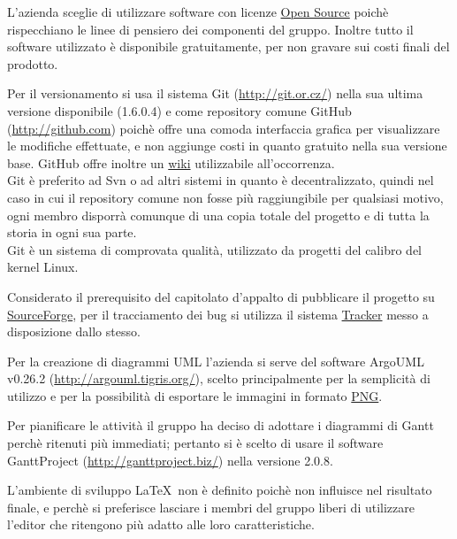 L'azienda sceglie di utilizzare software con licenze \underline{Open Source} poich\`e rispecchiano le linee di pensiero dei componenti del gruppo. Inoltre tutto il software utilizzato \`e disponibile gratuitamente, per non gravare sui costi finali del prodotto.

Per il versionamento si usa il sistema Git (\href{http://git.or.cz/}{http://git.or.cz/}) nella sua ultima versione disponibile (1.6.0.4) e come repository comune GitHub (\href{http://github.com}{http://github.com}) poich\`e offre una comoda interfaccia grafica per visualizzare le modifiche effettuate, e non aggiunge costi in quanto gratuito nella sua versione base. GitHub offre inoltre un \underline{wiki} utilizzabile all'occorrenza.\\
Git \`e preferito ad Svn o ad altri sistemi in quanto \`e decentralizzato, quindi nel caso in cui il repository comune non fosse pi\`u raggiungibile per qualsiasi motivo, ogni membro disporr\`a comunque di una copia totale del progetto e di tutta la storia in ogni sua parte.\\
Git \`e un sistema di comprovata qualit\`a, utilizzato da progetti del calibro del kernel Linux.

Considerato il prerequisito del capitolato d'appalto di pubblicare il progetto su \href{http://sourceforge.net}{SourceForge}, per il tracciamento dei bug si utilizza il sistema \href{https://sourceforge.net/tracker/?group_id=245619}{Tracker} messo a disposizione dallo stesso.

Per la creazione di diagrammi UML l'azienda si serve del software ArgoUML v0.26.2 (\href{http://argouml.tigris.org/}{http://argouml.tigris.org/}), scelto principalmente per la semplicit\`a di utilizzo e per la possibilit\`a di esportare le immagini in formato \underline{PNG}.

Per pianificare le attivit\`a il gruppo ha deciso di adottare i diagrammi di Gantt perch\`e ritenuti pi\`u immediati; pertanto si \`e scelto di usare il software GanttProject (\href{http://ganttproject.biz/}{http://ganttproject.biz/}) nella versione 2.0.8.

L'ambiente di sviluppo \LaTeX \ non \`e definito poich\`e non influisce nel risultato finale, e perch\`e si preferisce lasciare i membri del gruppo liberi di utilizzare l'editor che ritengono pi\`u adatto alle loro caratteristiche.


